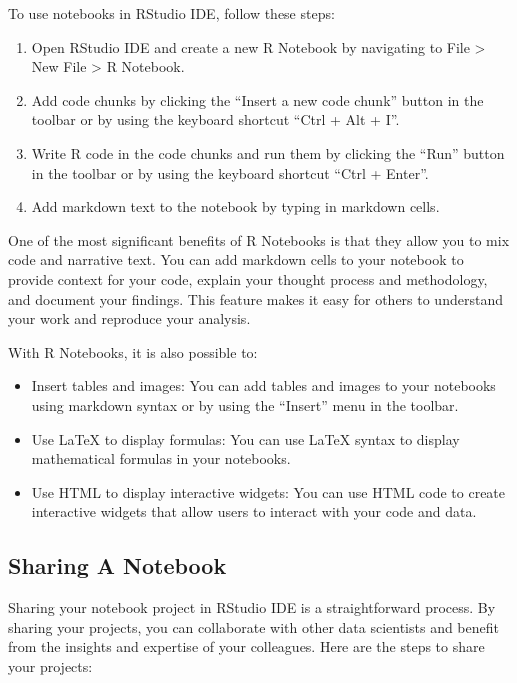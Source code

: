 \documentclass[
]{book}
\providecommand{\tightlist}{%
  \setlength{\itemsep}{0pt}\setlength{\parskip}{0pt}}
\begin{document}
To use notebooks in RStudio IDE, follow these steps:

\begin{enumerate}
\def\labelenumi{\arabic{enumi}.}
\tightlist
\item
  Open RStudio IDE and create a new R Notebook by navigating to File \textgreater{} New File \textgreater{} R Notebook.
\item
  Add code chunks by clicking the ``Insert a new code chunk'' button in the toolbar or by using the keyboard shortcut ``Ctrl + Alt + I''.
\item
  Write R code in the code chunks and run them by clicking the ``Run'' button in the toolbar or by using the keyboard shortcut ``Ctrl + Enter''.
\item
  Add markdown text to the notebook by typing in markdown cells.
\end{enumerate}

One of the most significant benefits of R Notebooks is that they allow you to mix code and narrative text. You can add markdown cells to your notebook to provide context for your code, explain your thought process and methodology, and document your findings. This feature makes it easy for others to understand your work and reproduce your analysis.

With R Notebooks, it is also possible to:

\begin{itemize}
\tightlist
\item
  Insert tables and images: You can add tables and images to your notebooks using markdown syntax or by using the ``Insert'' menu in the toolbar.
\item
  Use LaTeX to display formulas: You can use LaTeX syntax to display mathematical formulas in your notebooks.
\item
  Use HTML to display interactive widgets: You can use HTML code to create interactive widgets that allow users to interact with your code and data.
\end{itemize}

\hypertarget{sharing-a-notebook}{%
\subsection*{Sharing A Notebook}\label{sharing-a-notebook}}

Sharing your notebook project in RStudio IDE is a straightforward process. By sharing your projects, you can collaborate with other data scientists and benefit from the insights and expertise of your colleagues. Here are the steps to share your projects:
\end{document}
